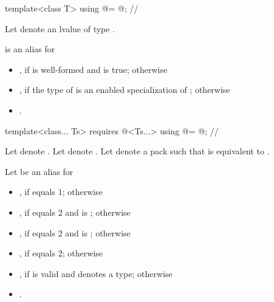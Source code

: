 \begin{itemdecl}
template<class T> using @\deducedsimd@ = @\seebelow@; // \expos
\end{itemdecl}
\begin{itemdescr}
  \pnum Let  denote an lvalue of type .

  \pnum {} is an alias for
  \begin{itemize}
    \item {}, if  is well-formed and
       is true; otherwise

    \item {},
      if the type of  is an enabled specialization of ;
      otherwise

    \item {}.
  \end{itemize}
\end{itemdescr}

\begin{itemdecl}
template<class... Ts>
  requires @\mathfloatingpoint@<Ts...>
    using @\mathcommonsimd@ = @\seebelow@; // \expos
\end{itemdecl}
\begin{itemdescr}
  \pnum
  Let  denote .
  Let  denote .
  Let  denote a pack such that  is equivalent to .

  \pnum
  Let  be an alias for
  \begin{itemize}
    \item {}, if  equals $1$; otherwise

    \item {}, if 
      equals $2$ and  is ;
      otherwise

    \item {}, if 
      equals $2$ and  is ; otherwise

    \item {}, if 
      equals $2$; otherwise

    \item {}, if  is valid and denotes a type; otherwise

    \item {}.
  \end{itemize}
\end{itemdescr}


